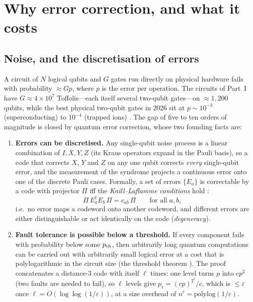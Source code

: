 \section{Why error correction, and what it costs}\label{sec:qec-why}

\subsection{Noise, and the discretisation of errors}

A circuit of $N$ logical qubits and $G$ gates run directly on physical hardware fails with probability $\approx Gp$, where $p$ is the error per operation. The circuits of Part~I have $G\approx4\times10^7$ Toffolis---each itself several two-qubit gates---on $\approx1{,}200$ qubits, while the best physical two-qubit gates in 2026 sit at $p\sim10^{-3}$ (superconducting) to $10^{-4}$ (trapped ions) \cite{willow25,walkingcat26}. The gap of five to ten orders of magnitude is closed by quantum error correction, whose two founding facts are:

\begin{enumerate}[leftmargin=*]
\item \textbf{Errors can be discretised.} Any single-qubit noise process is a linear combination of $I,X,Y,Z$ (its Kraus operators expand in the Pauli basis), so a code that corrects $X$, $Y$ and $Z$ on any one qubit corrects \emph{every} single-qubit error, and the measurement of the syndrome projects a continuous error onto one of the discrete Pauli cases. Formally, a set of errors $\{E_a\}$ is correctable by a code with projector $\Pi$ iff the \emph{Knill--Laflamme conditions} hold \cite{knill-laflamme97}:
\begin{equation}\label{eq:KL}
\Pi\,E_a^\dagger E_b\,\Pi=c_{ab}\,\Pi\qquad\text{for all }a,b ,
\end{equation}
i.e.\ no error maps a codeword onto another codeword, and different errors are either distinguishable or act identically on the code (\emph{degeneracy}).
\item \textbf{Fault tolerance is possible below a threshold.} If every component fails with probability below some $p_{\rm th}$, then arbitrarily long quantum computations can be carried out with arbitrarily small logical error at a cost that is polylogarithmic in the circuit size (the threshold theorem \cite{aharonov-benor08,knill05}). The proof concatenates a distance-$3$ code with itself $\ell$ times: one level turns $p$ into $cp^2$ (two faults are needed to fail), so $\ell$ levels give $p_\ell=(cp)^{2^\ell}/c$, which is $\le\varepsilon$ once $\ell=O(\log\log(1/\varepsilon))$, at a size overhead of $n^\ell=\mathrm{polylog}(1/\varepsilon)$.
\end{enumerate}

